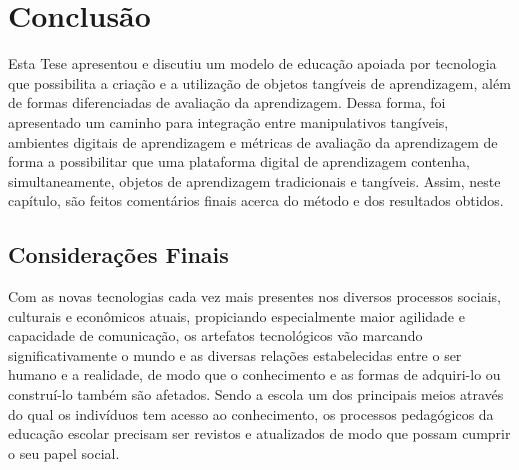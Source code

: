 
\chapter{Conclusão} \label{Chap:endFuture}


Esta Tese apresentou e discutiu um modelo de educação apoiada por tecnologia que possibilita a criação e a utilização de objetos tangíveis de aprendizagem, além de formas diferenciadas de avaliação da aprendizagem. 
Dessa forma, foi apresentado um caminho para integração entre manipulativos tangíveis, ambientes digitais de aprendizagem e métricas de avaliação da aprendizagem de forma a possibilitar que uma plataforma digital de aprendizagem contenha, simultaneamente, objetos de aprendizagem tradicionais e tangíveis. Assim, neste capítulo, 
são feitos comentários finais acerca do método e dos resultados obtidos.

\section{Considerações Finais}



Com as novas tecnologias cada vez mais presentes nos diversos processos sociais, culturais e econômicos atuais, propiciando especialmente maior agilidade e capacidade de comunicação, os artefatos tecnológicos vão marcando significativamente o mundo e as diversas relações estabelecidas entre o ser humano e a realidade, de modo que o conhecimento e as formas de adquiri-lo ou construí-lo também são afetados. Sendo a escola um dos principais meios através do qual os indivíduos tem acesso ao conhecimento, os processos pedagógicos da educação escolar precisam ser revistos e atualizados de modo que possam cumprir o seu papel social.

